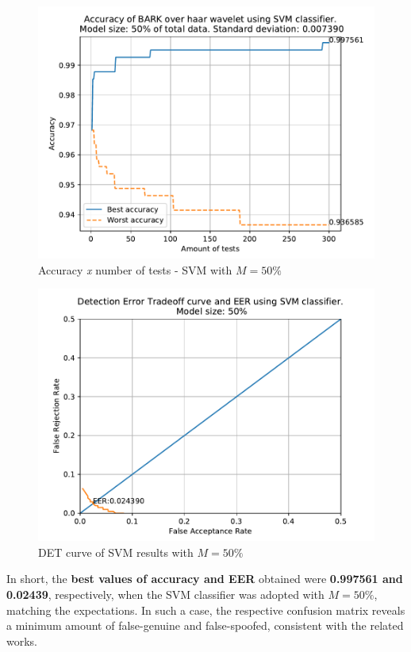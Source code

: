 		\begin{figure}[H]
			\centering
			\includegraphics[scale=.8]{images/results/confusionMatrices/classifier_SVM_50.pdf}
			\caption{Accuracy \textit{x} number of tests - SVM with $M=50\%$}
			\label{fig:classifiersvm50}
		\end{figure}
		\begin{figure}[H]
			\centering
			\includegraphics[scale=.8]{images/results/det/DET_for_classifier_SVM_50.pdf}
			\caption{DET curve of SVM results with $M=50\%$}
			\label{fig:detsvm50}
		\end{figure}
	
		\par In short, the \textbf{best values of accuracy and EER} obtained were \textbf{0.997561 and 0.02439}, respectively, when the SVM classifier was adopted with $M=50\%$, matching the expectations. In such a case, the respective confusion matrix reveals a minimum amount of false-genuine and false-spoofed, consistent with the related works.
		\\
		
